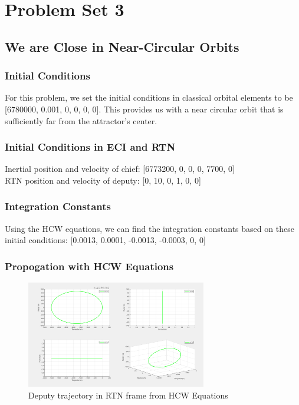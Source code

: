 \section{Problem Set 3}

\subsection{We are Close in Near-Circular Orbits}

\subsubsection{Initial Conditions}
For this problem, we set the initial conditions in classical orbital elements to be [6780000, 0.001, 0, 0, 0, 0]. This provides us with a near circular orbit that is sufficiently far from the attractor's center.

\subsubsection{Initial Conditions in ECI and RTN}
Inertial position and velocity of chief: [6773200, 0, 0, 0, 7700, 0]\\
RTN position and velocity of deputy: [0, 10, 0, 1, 0, 0]

\subsubsection{Integration Constants}

Using the HCW equations, we can find the integration constants based on these initial conditions: [0.0013, 0.0001, -0.0013, -0.0003, 0, 0]

\subsubsection{Propogation with HCW Equations}

\begin{figure}[H]
    \centering
    \includegraphics[width=0.7\textwidth]{PS3/Figures/HCW_Position.png}
    \caption{Deputy trajectory in RTN frame from HCW Equations}
    \label{fig:hcw_position}
\end{figure}


